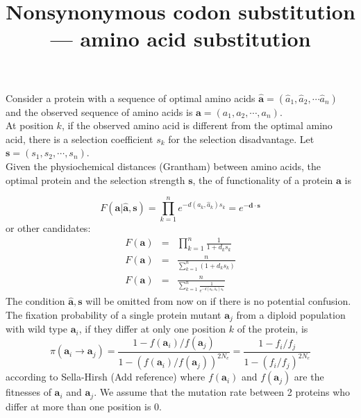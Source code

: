 \documentclass[13pt]{article}
\title{Nonsynonymous codon substitution --- amino acid substitution}
\author{}
\begin{document}
\maketitle
Consider a protein with a sequence of optimal amino acids $\hat{\mathbf{a}} = (\hat{a}_1, \hat{a}_2, \cdots \hat{a}_n)$  and the observed sequence of amino acids is $\mathbf{a} = (a_1, a_2, \cdots, a_n)$.\\

At position $k$, if the observed amino acid is different from the optimal amino acid, there is a selection coefficient $s_k$ for the selection disadvantage. Let $\mathbf{s}=(s_1,s_2,\cdots,s_n)$.\\

Given the physiochemical distances (Grantham) between amino acids, the optimal protein and the selection strength $\mathbf{s}$, the of functionality of a protein $\mathbf{a}$ is

\begin{equation}
F(\mathbf{a}|\hat{\mathbf{a}},\mathbf{s})= \prod_{k=1}^{n}e^{-d(a_k, \hat{a}_k)s_k}=e^{-\mathbf{d}\cdot\mathbf{s}}
\label{eq:ftny}
\end{equation}
or other candidates:
\begin{eqnarray}
F(\mathbf{a}) & = & \prod_{k=1}^n \frac{1}{1+d_ks_k}\\
F(\mathbf{a}) & = & \frac{n}{\sum_{k=1}^n{(1+d_ks_k)}} \label{eq:harmonic}\\
F(\mathbf{a}) & = & \frac{n}{\sum_{k=1}^{n}\frac{1}{e^{-d(a_k, \hat{a}_k)s_k}}}
\end{eqnarray}
The condition $\hat{\mathbf{a}},\mathbf{s}$ will be omitted from now on if there is no potential confusion.\\

The fixation probability of a single protein mutant $\mathbf{a}_j$ from a diploid population with wild type $\mathbf{a}_i$, if they differ at only one position $k$ of the protein, is 
\begin{equation}
\pi(\mathbf{a}_i \rightarrow \mathbf{a}_j ) = \frac{1-f(\mathbf{a}_i)/f(\mathbf{a}_j)}{1-(f(\mathbf{a}_i)/f(\mathbf{a}_j))^{2N_e}} = \frac{1-f_i/f_j}{1-(f_i/f_j)^{2N_e}}
\label{eq:fixation}
\end{equation}
according to Sella-Hirsh (Add reference)
where $f(\mathbf{a}_i)$ and $f(\mathbf{a}_j)$ are the fitnesses of $\mathbf{a}_i$ and $\mathbf{a}_j$. We assume that the mutation rate between 2 proteins who differ at more than one position is 0. \\
\end{document}
